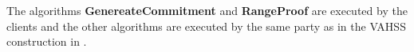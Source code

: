 The algorithms \textbf{GenereateCommitment} and \textbf{RangeProof} are executed by the clients and the other algorithms are executed by the same party as in the  VAHSS construction in \cite{SumItUp}. 



